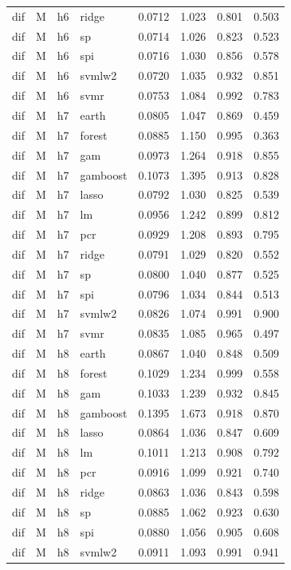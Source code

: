 \begin{ThreePartTable}
\begin{longtable}[t]{llclcccc}
dif & M & h6 & ridge & 0.0712 & 1.023 & 0.801 & 0.503\\
dif & M & h6 & sp & 0.0714 & 1.026 & 0.823 & 0.523\\
dif & M & h6 & spi & 0.0716 & 1.030 & 0.856 & 0.578\\
dif & M & h6 & svmlw2 & 0.0720 & 1.035 & 0.932 & 0.851\\
dif & M & h6 & svmr & 0.0753 & 1.084 & 0.992 & 0.783\\
\addlinespace
dif & M & h7 & earth & 0.0805 & 1.047 & 0.869 & 0.459\\
dif & M & h7 & forest & 0.0885 & 1.150 & 0.995 & 0.363\\
dif & M & h7 & gam & 0.0973 & 1.264 & 0.918 & 0.855\\
dif & M & h7 & gamboost & 0.1073 & 1.395 & 0.913 & 0.828\\
dif & M & h7 & lasso & 0.0792 & 1.030 & 0.825 & 0.539\\
dif & M & h7 & lm & 0.0956 & 1.242 & 0.899 & 0.812\\
dif & M & h7 & pcr & 0.0929 & 1.208 & 0.893 & 0.795\\
dif & M & h7 & ridge & 0.0791 & 1.029 & 0.820 & 0.552\\
dif & M & h7 & sp & 0.0800 & 1.040 & 0.877 & 0.525\\
dif & M & h7 & spi & 0.0796 & 1.034 & 0.844 & 0.513\\
dif & M & h7 & svmlw2 & 0.0826 & 1.074 & 0.991 & 0.900\\
dif & M & h7 & svmr & 0.0835 & 1.085 & 0.965 & 0.497\\
\addlinespace
dif & M & h8 & earth & 0.0867 & 1.040 & 0.848 & 0.509\\
dif & M & h8 & forest & 0.1029 & 1.234 & 0.999 & 0.558\\
dif & M & h8 & gam & 0.1033 & 1.239 & 0.932 & 0.845\\
dif & M & h8 & gamboost & 0.1395 & 1.673 & 0.918 & 0.870\\
dif & M & h8 & lasso & 0.0864 & 1.036 & 0.847 & 0.609\\
dif & M & h8 & lm & 0.1011 & 1.213 & 0.908 & 0.792\\
dif & M & h8 & pcr & 0.0916 & 1.099 & 0.921 & 0.740\\
dif & M & h8 & ridge & 0.0863 & 1.036 & 0.843 & 0.598\\
dif & M & h8 & sp & 0.0885 & 1.062 & 0.923 & 0.630\\
dif & M & h8 & spi & 0.0880 & 1.056 & 0.905 & 0.608\\
dif & M & h8 & svmlw2 & 0.0911 & 1.093 & 0.991 & 0.941\\

\end{longtable}
\end{ThreePartTable}
